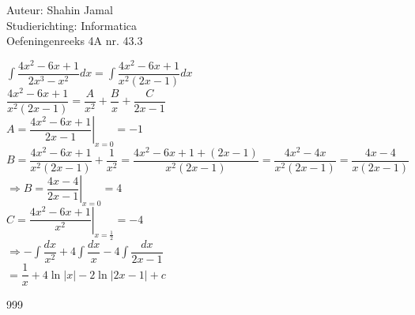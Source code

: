 \documentclass[a4paper]{article}
\begin{document}
  
\noindent \large Auteur: Shahin Jamal \\
\noindent \large Studierichting: Informatica\\
\noindent \large Oefeningenreeks 4A nr. 43.3\\

\medskip

\normalsize

$\displaystyle\int\dfrac{4x^2-6x+1}{2x^3-x^2}dx = \displaystyle\int\dfrac{4x^2-6x+1}{x^2(2x-1)}dx$\\

$\dfrac{4x^2-6x+1}{x^2(2x-1)} = \dfrac{A}{x^2} + \dfrac{B}{x} + \dfrac{C}{2x-1}$\\

$A = \left . \dfrac{4x^2-6x+1}{2x-1} \right |_{x=0} = -1$\\

$B = \dfrac{4x^2-6x+1}{x^2(2x-1)} + \dfrac{1}{x^2} = \dfrac{4x^2-6x+1+(2x-1)}{x^2(2x-1)}= \dfrac{4x^2-4x}{x^2(2x-1)} = \dfrac{4x-4}{x(2x-1)}$\\

$\Rightarrow B = \left . \dfrac{4x-4}{2x-1} \right |_{x=0} = 4$\\

$C = \left . \dfrac{4x^2-6x+1}{x^2} \right |_{x=\tfrac{1}{2}} = -4$\\

$\Rightarrow - \displaystyle\int\dfrac{dx}{x^2} + 4\displaystyle\int\dfrac{dx}{x} - 4\displaystyle\int\dfrac{dx}{2x-1}$\\

$= \dfrac{1}{x} + 4\ln\lvert x \rvert - 2\ln \lvert 2x-1 \rvert + c$\\

\begin{thebibliography}{999}
\end{thebibliography}
\end{document}
